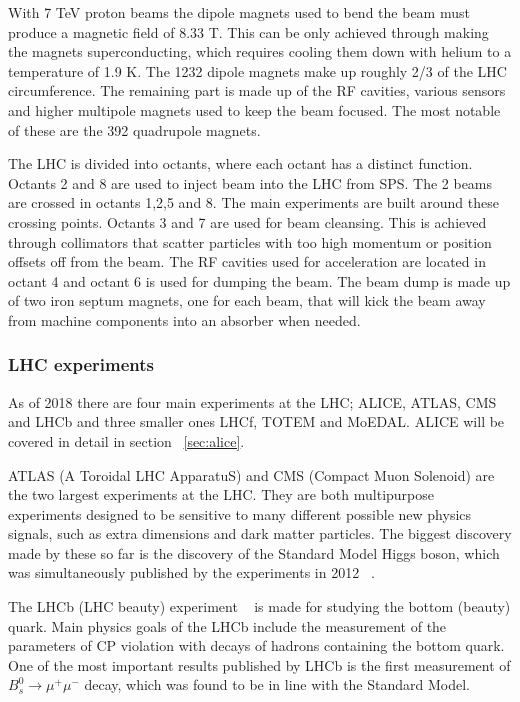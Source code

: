 With 7 TeV proton beams the dipole magnets used to bend the beam must produce a magnetic field of 8.33 T. This can be only achieved through making the magnets superconducting, which requires cooling them down with helium to a temperature of 1.9 K. The 1232 dipole magnets make up roughly 2/3 of the LHC circumference. The remaining part is made up of the RF cavities, various sensors and higher multipole magnets used to keep the beam focused. The most notable of these are the 392 quadrupole magnets.

The LHC is divided into octants, where each octant has a distinct function. Octants 2 and 8 are used to inject beam into the LHC from SPS. The 2 beams are crossed in octants 1,2,5 and 8. The main experiments are built around these crossing points. Octants 3 and 7 are used for beam cleansing. This is achieved through collimators that scatter particles with too high momentum or position offsets off from the beam. The RF cavities used for acceleration are located in octant 4 and octant 6 is used for dumping the beam. The beam dump is made up of two iron septum magnets, one for each beam, that will kick the beam away from machine components into an absorber when needed. 


\subsubsection{LHC experiments}
As of 2018 there are four main experiments at the LHC; ALICE, ATLAS, CMS and LHCb and three smaller ones LHCf, TOTEM and MoEDAL. ALICE will be covered in detail in section ~\ref{sec:alice}. 

ATLAS (A Toroidal LHC ApparatuS) and CMS (Compact Muon Solenoid) are the two largest experiments at the LHC. They are both multipurpose experiments designed to be sensitive to many different possible new physics signals, such as extra dimensions and dark matter particles. The biggest discovery made by these so far is the discovery of the Standard Model Higgs boson, which was simultaneously published by the experiments in 2012 ~\cite{Aad:2012tfa, Chatrchyan:2012xdj}.

The LHCb (LHC beauty) experiment ~\cite{Alves:2008zz} is made for studying the bottom (beauty) quark. Main physics goals of the LHCb include the measurement of the parameters of CP violation with decays of hadrons containing the bottom quark. One of the most important results published by LHCb is the first measurement of $B_s^0\rightarrow \mu^+ \mu^-$ decay, which was found to be in line with the Standard Model.

